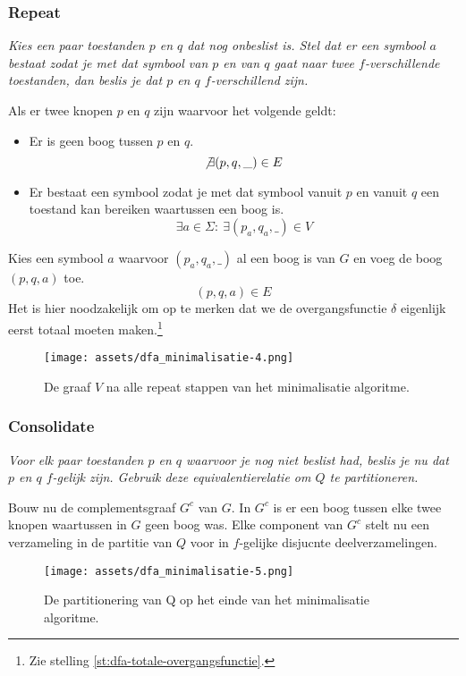 \documentclass[main.tex]{subfiles}
\begin{document}
\begin{al}
  \subsubsection{Repeat}
  \textit{
    Kies een paar toestanden $p$ en $q$ dat nog onbeslist is.
    Stel dat er een symbool $a$ bestaat zodat je met dat symbool van $p$ en van $q$ gaat naar twee $f$-verschillende toestanden, dan beslis je dat $p$ en $q$ $f$-verschillend zijn.
  }

  Als er twee knopen $p$ en $q$ zijn waarvoor het volgende geldt:
  \begin{itemize}
  \item Er is geen boog tussen $p$ en $q$.
    \[ \not\exists (p,q,\_) \in E \]
  \item Er bestaat een symbool zodat je met dat symbool vanuit $p$ en vanuit $q$ een toestand kan bereiken waartussen een boog is.
    \[ \exists a \in \Sigma:\ \exists(p_{a},q_{a},\_) \in V \]
  \end{itemize}
  Kies een symbool $a$ waarvoor $(p_{a},q_{a},\_)$ al een boog is van $G$ en voeg de boog $(p,q,a)$ toe.
  \[ (p,q,a) \in E \]
  Het is hier noodzakelijk om op te merken dat we de overgangsfunctie $\delta$ eigenlijk eerst totaal moeten maken.\footnote{Zie stelling \ref{st:dfa-totale-overgangsfunctie}.}

  \begin{figure}[H]
    \centering
    \texttt{[image: assets/dfa\_minimalisatie-4.png]}     
    \caption{De graaf $V$ na alle repeat stappen van het minimalisatie algoritme.}
    \label{fig:dfa-minimalisatie-4}
  \end{figure}

  \subsubsection{Consolidate}
  \textit{
    Voor elk paar toestanden $p$ en $q$ waarvoor je nog niet beslist had, beslis je nu dat $p$ en $q$ $f$-gelijk zijn.
    Gebruik deze equivalentierelatie om $Q$ te partitioneren.
  }  

  Bouw nu de complementsgraaf $G^{c}$ van $G$.
  In $G^{c}$ is er een boog tussen elke twee knopen waartussen in $G$ geen boog was.
  Elke component van $G^{c}$ stelt nu een verzameling in de partitie van $Q$ voor in $f$-gelijke disjucnte deelverzamelingen.

  \begin{figure}[H]
    \centering
    \texttt{[image: assets/dfa\_minimalisatie-5.png]}     
    \caption{De partitionering van Q op het einde van het minimalisatie algoritme.}
    \label{fig:dfa-minimalisatie-5}
  \end{figure}

\end{al}
\end{document}
